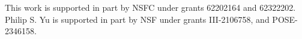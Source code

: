


\begin{acks}
This work is supported in part by NSFC under grants 62202164 and 62322202. Philip S. Yu is supported in part by NSF under grants III-2106758, and POSE-2346158.
\end{acks}




